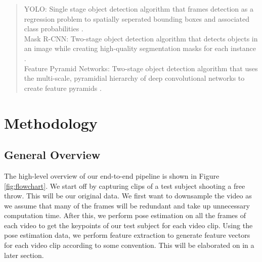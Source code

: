 \documentclass[10pt,twocolumn,letterpaper]{article}
\begin{document}
\begin{quotation}
  YOLO: Single stage object detection algorithm that frames detection as a regression problem to spatially seperated bounding boxes and associated class probabilities \cite{YOLO}.\\
  \newline
  \indent Mask R-CNN: Two-stage object detection algorithm that detects objects in an image while creating high-quality segmentation masks for each instance \cite{PatternRec}.\\
  \newline
  \indent Feature Pyramid Networks: Two-stage object detection algorithm that uses the multi-scale, pyramidial hierarchy of deep convolutional networks to create feature pyramids \cite{FeaturePyr}. \\
\end{quotation}

\section{Methodology}
\subsection{General Overview}

The high-level overview of our end-to-end pipeline is shown in Figure \ref{fig:flowchart}. We start off by capturing clips of a test subject shooting a free throw. This will be our 
original data. We first want to downsample the video as we assume that many of the frames will be redundant and take up unnecessary computation time. After this, we perform pose estimation
on all the frames of each video to get the keypoints of our test subject for each video clip. Using the pose estimation data, we perform
feature extraction to generate feature vectors for each video clip according to some convention. This will be elaborated on in a later section. 
\end{document}

